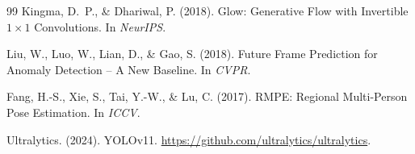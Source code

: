 \documentclass{article}
\begin{document}
\begin{thebibliography}{99}
Kingma, D.~P., \& Dhariwal, P. (2018).
\newblock Glow: Generative Flow with Invertible $1{\times}1$ Convolutions. In
{\em NeurIPS}.

Liu, W., Luo, W., Lian, D., \& Gao, S. (2018).
\newblock Future Frame Prediction for Anomaly Detection -- A New Baseline. In
{\em CVPR}.

Fang, H.-S., Xie, S., Tai, Y.-W., \& Lu, C. (2017).
\newblock RMPE: Regional Multi-Person Pose Estimation. In {\em ICCV}.

Ultralytics. (2024). YOLOv11. \url{https://github.com/ultralytics/ultralytics}.

\end{thebibliography}
\end{document}
